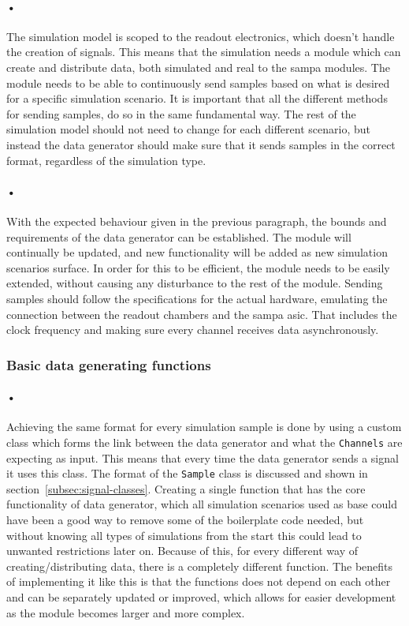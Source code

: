 \documentclass[a4paper, 12pt]{report}
\newcommand{\codeword}[1]{\texttt{#1}}
\begin{document}
\paragraph{•}
The simulation model is scoped to the readout electronics, which doesn't handle the creation of signals.
This means that the simulation needs a module which can create and distribute data, both simulated and real to the \gls{sampa} modules.
The module needs to be able to continuously send samples based on what is desired for a specific simulation scenario.
It is important that all the different methods for sending samples, do so in the same fundamental way.
The rest of the simulation model should not need to change for each different scenario, but instead the data generator should make sure that it sends samples in the correct format, regardless of the simulation type.

\paragraph{•}
With the expected behaviour given in the previous paragraph, the bounds and requirements of the data generator can be established.
The module will continually be updated, and new functionality will be added as new simulation scenarios surface. 
In order for this to be efficient, the module needs to be easily extended, without causing any disturbance to the rest of the module.
Sending samples should follow the specifications for the actual hardware, emulating the connection between the readout chambers and the \gls{sampa} asic.
That includes the clock frequency and making sure every channel receives data asynchronously.

\subsubsection{Basic data generating functions}

\paragraph{•}
Achieving the same format for every simulation sample is done by using a custom class which forms the link between the data generator and what the \codeword{Channels} are expecting as input.
This means that every time the data generator sends a signal it uses this class.
The format of the \codeword{Sample} class is discussed and shown in section~\ref{subsec:signal-classes}.
Creating a single function that has the core functionality of data generator, which all simulation scenarios used as base could have been a good way to remove some of the boilerplate code needed, but without knowing all types of simulations from the start this could lead to unwanted restrictions later on.
Because of this, for every different way of creating/distributing data, there is a completely different function.
The benefits of implementing it like this is that the functions does not depend on each other and can be separately updated or improved, which allows for easier development as the module becomes larger and more complex.
\end{document}
